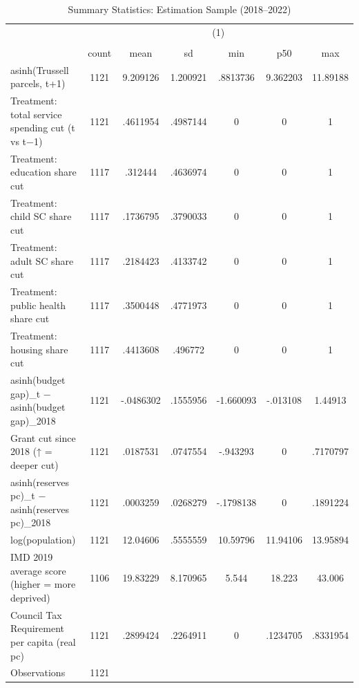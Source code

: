 \begin{table}[htbp]\centering
\def\sym#1{\ifmmode^{#1}\else\(^{#1}\)\fi}
\caption{Summary Statistics: Estimation Sample (2018--2022)}
\begin{tabular}{l*{1}{cccccc}}
\toprule
                    &\multicolumn{6}{c}{(1)}                                                      \\
                    &\multicolumn{6}{c}{}                                                         \\
                    &       count&        mean&          sd&         min&         p50&         max\\
\midrule
asinh(Trussell parcels, t+1)&        1121&    9.209126&    1.200921&    .8813736&    9.362203&    11.89188\\
Treatment: total service spending cut (t vs t−1)&        1121&    .4611954&    .4987144&           0&           0&           1\\
Treatment: education share cut&        1117&     .312444&    .4636974&           0&           0&           1\\
Treatment: child SC share cut&        1117&    .1736795&    .3790033&           0&           0&           1\\
Treatment: adult SC share cut&        1117&    .2184423&    .4133742&           0&           0&           1\\
Treatment: public health share cut&        1117&    .3500448&    .4771973&           0&           0&           1\\
Treatment: housing share cut&        1117&    .4413608&     .496772&           0&           0&           1\\
asinh(budget gap)\_t − asinh(budget gap)\_2018&        1121&   -.0486302&    .1555956&   -1.660093&    -.013108&     1.44913\\
Grant cut since 2018 (↑ = deeper cut)&        1121&    .0187531&    .0747554&    -.943293&           0&    .7170797\\
asinh(reserves pc)\_t − asinh(reserves pc)\_2018&        1121&    .0003259&    .0268279&   -.1798138&           0&    .1891224\\
log(population)     &        1121&    12.04606&    .5555559&    10.59796&    11.94106&    13.95894\\
IMD 2019 average score (higher = more deprived)&        1106&    19.83229&    8.170965&       5.544&      18.223&      43.006\\
Council Tax Requirement per capita (real pc)&        1121&    .2899424&    .2264911&           0&    .1234705&    .8331954\\
\midrule
Observations        &        1121&            &            &            &            &            \\
\bottomrule
\end{tabular}
\end{table}
